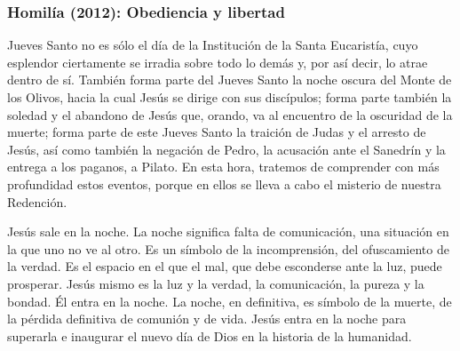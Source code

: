 \label{b-05-01-2009H}
\newpage
\subsubsection{Homilía (2012): Obediencia y libertad}


\begin{body}
 Jueves Santo no es sólo el día de la Institución de la Santa Eucaristía, cuyo esplendor ciertamente se irradia sobre todo lo demás y, por así decir, lo atrae dentro de sí. También forma parte del Jueves Santo la noche oscura del Monte de los Olivos, hacia la cual Jesús se dirige con sus discípulos; forma parte también la soledad y el abandono de Jesús que, orando, va al encuentro de la oscuridad de la muerte; forma parte de este Jueves Santo la traición de Judas y el arresto de Jesús, así como también la negación de Pedro, la acusación ante el Sanedrín y la entrega a los paganos, a Pilato. En esta hora, tratemos de comprender con más profundidad estos eventos, porque en ellos se lleva a cabo el misterio de nuestra Redención.

Jesús sale en la noche. La noche significa falta de comunicación, una situación en la que uno no ve al otro. Es un símbolo de la incomprensión, del ofuscamiento de la verdad. Es el espacio en el que el mal, que debe esconderse ante la luz, puede prosperar. Jesús mismo es la luz y la verdad, la comunicación, la pureza y la bondad. Él entra en la noche. La noche, en definitiva, es símbolo de la muerte, de la pérdida definitiva de comunión y de vida. Jesús entra en la noche para superarla e inaugurar el nuevo día de Dios en la historia de la humanidad.


\end{body}
